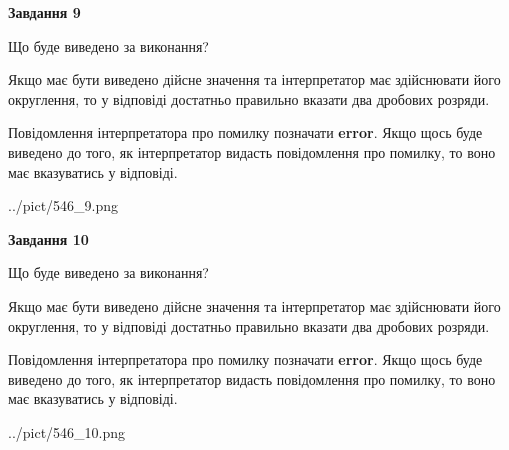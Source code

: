 \documentclass[12pt, ukrainian]{article}
\begin{document}
{\begin {Large}
{\begin {center}\textbf{Завдання 9}\end {center}}\par
Що буде виведено за виконання? \par

Якщо має бути виведено дійсне значення та інтерпретатор має здійснювати його округлення, 
то у відповіді достатньо правильно вказати два дробових розряди.

Повідомлення інтерпретатора про помилку позначати \textbf{error}.
Якщо щось буде виведено до того, як інтерпретатор видасть повідомлення про помилку, 
то воно має вказуватись у відповіді. \par

\begin{center}
	{../pict/546_9.png}
\end{center}
\newpage

{\begin {center}\textbf{Завдання 10}\end {center}}\par
Що буде виведено за виконання? \par

Якщо має бути виведено дійсне значення та інтерпретатор має здійснювати його округлення, 
то у відповіді достатньо правильно вказати два дробових розряди.

Повідомлення інтерпретатора про помилку позначати \textbf{error}.
Якщо щось буде виведено до того, як інтерпретатор видасть повідомлення про помилку, 
то воно має вказуватись у відповіді. \par

\begin{center}
	{../pict/546_10.png}
\end{center}
\newpage

\end {Large}}
\end{document}

